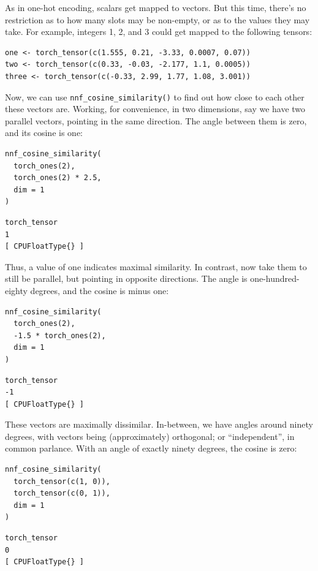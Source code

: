 \documentclass[
  letterpaper,
]{krantz}
\begin{document}
As in one-hot encoding, scalars get mapped to vectors. But this time,
there's no restriction as to how many slots may be non-empty, or as to
the values they may take. For example, integers 1, 2, and 3 could get
mapped to the following tensors:

\begin{verbatim}
one <- torch_tensor(c(1.555, 0.21, -3.33, 0.0007, 0.07))
two <- torch_tensor(c(0.33, -0.03, -2.177, 1.1, 0.0005))
three <- torch_tensor(c(-0.33, 2.99, 1.77, 1.08, 3.001))
\end{verbatim}

Now, we can use \texttt{nnf\_cosine\_similarity()} to find out how close
to each other these vectors are. Working, for convenience, in two
dimensions, say we have two parallel vectors, pointing in the same
direction. The angle between them is zero, and its cosine is one:

\begin{verbatim}
nnf_cosine_similarity(
  torch_ones(2),
  torch_ones(2) * 2.5,
  dim = 1
)
\end{verbatim}

\begin{verbatim}
torch_tensor
1
[ CPUFloatType{} ]
\end{verbatim}

Thus, a value of one indicates maximal similarity. In contrast, now take
them to still be parallel, but pointing in opposite directions. The
angle is one-hundred-eighty degrees, and the cosine is minus one:

\begin{verbatim}
nnf_cosine_similarity(
  torch_ones(2),
  -1.5 * torch_ones(2),
  dim = 1
)
\end{verbatim}

\begin{verbatim}
torch_tensor
-1
[ CPUFloatType{} ]
\end{verbatim}

These vectors are maximally dissimilar. In-between, we have angles
around ninety degrees, with vectors being (approximately) orthogonal; or
``independent'', in common parlance. With an angle of exactly ninety
degrees, the cosine is zero:

\begin{verbatim}
nnf_cosine_similarity(
  torch_tensor(c(1, 0)),
  torch_tensor(c(0, 1)),
  dim = 1
)
\end{verbatim}

\begin{verbatim}
torch_tensor
0
[ CPUFloatType{} ]
\end{verbatim}
\end{document}
